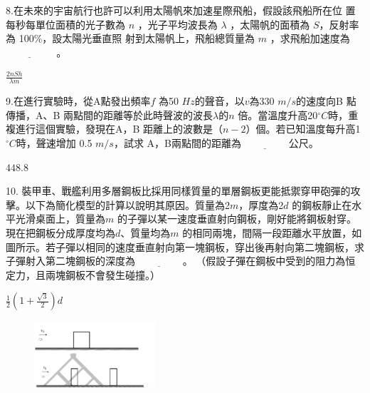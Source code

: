 \documentclass[cn,10pt,math=newtx,chinesefont=founder,device=ig]{elegantbook}
\begin{document}
\newpage


\begin{example}
   8.在未來的宇宙航行也許可以利用太陽帆來加速星際飛船，假設該飛船所在位
置每秒每單位面積的光子數為 $n$ ，光子平均波長為 $\lambda$ ，太陽帆的面積為 $S$，反射率為 100$\%$，設太陽光垂直照 射到太陽帆上，飛船總質量為 $m$ ，求飛船加速度為$\underline{\hspace{2cm}}$ 。\\
    \rightline{[復興高中教甄109]}
\end{example}
\begin{solution}
    $\frac{2nSh}{\lambda m}$
\end{solution}

\newpage


\begin{example}
   9.在進行實驗時，從A點發出頻率$f$ 為50 $Hz$的聲音，以$v$為330 $m/s$的速度向B 點傳播，A、B 兩點間的距離等於此時聲波的波長$\lambda$的$n$ 倍。當溫度升高20$^\circ C$時，重複進行這個實驗，發現在A，B 距離上的波數是$（n-2）$個。若已知溫度每升高1$^\circ C$時，聲速增加 0.5 $m/s$，試求 A，B兩點間的距離為$\underline{\hspace{2cm}}$公尺。\\
    \rightline{[復興高中教甄109]}
\end{example}
\begin{solution}
    $448.8$
\end{solution}

\newpage


\begin{example}
   10. 裝甲車、戰艦利用多層鋼板比採用同樣質量的單層鋼板更能抵禦穿甲砲彈的攻擊。以下為簡化模型的計算以說明其原因。質量為2$m$，厚度為2$d$ 的鋼板靜止在水平光滑桌面上，質量為$m$ 的子彈以某一速度垂直射向鋼板，剛好能將鋼板射穿。現在把鋼板分成厚度均為$d$、質量均為$m$ 的相同兩塊，間隔一段距離水平放置，如圖所示。若子彈以相同的速度垂直射向第一塊鋼板，穿出後再射向第二塊鋼板，求子彈射入第二塊鋼板的深度為$\underline{\hspace{2cm}}$。
（假設子彈在鋼板中受到的阻力為恒定力，且兩塊鋼板不會發生碰撞。）\\
    \rightline{[復興高中教甄109]}
\end{example}
\begin{solution}
    $\frac{1}{2}(1+\frac{\sqrt{3}}{2})d$
\end{solution}
\begin{figure}[htbp]
    \flushright
    \includegraphics[width=0.4\textwidth]{image/109復興10.png}
  \end{figure}
\newpage
\end{document}
